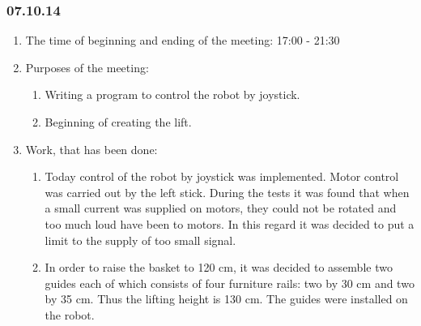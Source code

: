 
\subsubsection{07.10.14}

\begin{enumerate}
	\item The time of beginning and ending of the meeting:
	17:00 - 21:30
	\item Purposes of the meeting:
	\begin{enumerate}
	  \item Writing a program to control the robot by joystick.
	  
	  \item Beginning of creating the lift.
	  
    \end{enumerate}
	\item Work, that has been done:
	\begin{enumerate}
	  \item Today control of the robot by joystick was implemented. Motor control was carried out by the left stick. During the tests it was found that when a small current was supplied on motors, they could not be rotated and too much loud have been to motors. In this regard it was decided to put a limit to the supply of too small signal.
	  
      \item  In order to raise the basket to 120 cm, it was decided to assemble two guides each of which consists of four furniture rails: two by 30 cm and two by 35 cm. Thus the lifting height is 130 cm. The guides were installed on the robot.
      

\end{enumerate}
\end{enumerate}
